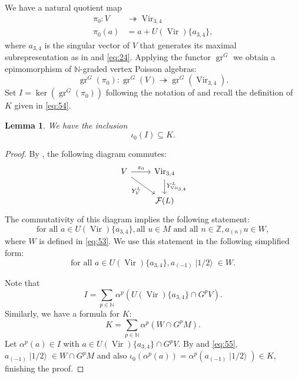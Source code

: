 \documentclass[a4paper, 12pt, reqno]{amsart}
\newtheorem{lemma}[theorem]{Lemma}
\theoremstyle{remark}
\numberwithin{equation}{subsection}
\DeclareMathOperator{\Vir}{Vir}
\DeclareMathOperator{\gr}{gr}
\DeclareMathOperator{\vachalf}{|1/2\rangle}
\begin{document}
We have a natural quotient map
\begin{align*}
  \pi_0: V &\twoheadrightarrow \Vir_{3, 4} \\
  \pi_0(a) &= a + U(\Vir)\{a_{3, 4}\},
\end{align*}
where $a_{3, 4}$  is the singular vector of $V$ that generates its maximal subrepresentation as in \cite{andrews_singular_2022} and \eqref{eq:24}.
Applying the functor $\gr^G$ we obtain a epimomorphism of $\mathbb{N}$-graded vertex Poisson algebras:
\begin{equation*}
  \gr^G(\pi_0): \gr^G(V) \twoheadrightarrow \gr^G(\Vir_{3, 4}).
\end{equation*}
Set $I = \ker(\gr^G(\pi_0))$ following the notation of \cite{andrews_singular_2022} and recall the definition of $K$ given in \eqref{eq:54}.

\begin{lemma}
  \label{lmm:29}
  We have the inclusion
  \begin{equation*}
    \iota_0(I) \subseteq K.
  \end{equation*}
\end{lemma}

\begin{proof}
  By , the following diagram commutes:
  \begin{equation*}
    \begin{tikzcd}
      V \arrow[r, "\pi_0"] \arrow[rd, "{Y^{L}_{V}}"'] & {\Vir_{3, 4}} \arrow[d, "{Y^{L}_{\Vir_{3, 4}}}"] \\
      & {\mathcal{F}(L)}
    \end{tikzcd}
  \end{equation*}
  The commutativity of this diagram implies the following statement:
  \begin{equation*}
    \text{for all }a \in U(\Vir)\{a_{3, 4}\}, \text{all } u \in M\text{ and  all }n \in \mathbb{Z}, a_{(n)}u \in W,
  \end{equation*}
  where $W$ is defined in \eqref{eq:53}.
  We use this statement in the following simplified form:
  \begin{equation}
    \label{eq:55}
    \text{for all }a \in U(\Vir)\{a_{3, 4}\}, a_{(-1)}\vachalf \in W.
  \end{equation}
  
  Note that
  \begin{equation*}
    I = \sum_{p \in \mathbb{N}}\alpha^p(U(\Vir)\{a_{3, 4}\} \cap G^pV).
  \end{equation*}
  Similarly, we have a formula for $K$:
  \begin{equation*}
    K = \sum_{p \in \mathbb{N}}\alpha^p(W \cap G^pM).
  \end{equation*}
  Let $\alpha^p(a) \in I$ with $a \in U(\Vir)\{a_{3, 4}\} \cap G^pV$.
  By  and \eqref{eq:55}, $a_{(-1)}\vachalf \in W \cap G^pM$ and also $\iota_0(\alpha^p(a)) = \alpha^p(a_{(-1)}\vachalf) \in K$, finishing the proof.
\end{proof}
\end{document}
